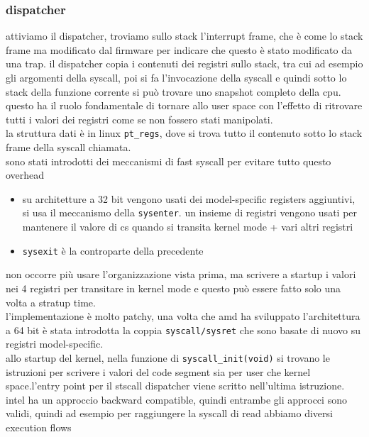 \documentclass[12pt, oneside]{extbook} %
\begin{document}
\subsubsection{dispatcher}
attiviamo il dispatcher, troviamo sullo stack l'interrupt frame, che è come lo stack frame ma modificato dal firmware per indicare che questo è stato modificato da una trap. il dispatcher copia i contenuti dei registri sullo stack, tra cui ad esempio gli argomenti della syscall, poi si fa l'invocazione della syscall e quindi sotto lo stack della funzione corrente si può trovare uno snapshot completo della cpu. questo ha il ruolo fondamentale di tornare allo user space con l'effetto di ritrovare tutti i valori dei registri come se non fossero stati manipolati.\\la struttura dati è in linux \texttt{pt\_regs}, dove si trova tutto il contenuto sotto lo stack frame della syscall chiamata.\\sono stati introdotti dei meccanismi di fast syscall per evitare tutto questo overhead
\begin{itemize}
\item su architetture a 32 bit vengono usati dei model-specific registers aggiuntivi, si usa il meccanismo della \texttt{sysenter}. un insieme di 
registri vengono usati per mantenere il valore di cs quando si transita kernel mode + vari altri registri
\item \texttt{sysexit} è la controparte della precedente
\end{itemize}
non occorre più usare l'organizzazione vista prima, ma scrivere a startup i valori nei 4 registri per transitare in kernel mode e questo può essere fatto solo una volta a stratup time.\\l'implementazione è molto patchy, una volta che amd ha sviluppato l'architettura a 64 bit è stata introdotta la coppia \texttt{syscall/sysret} che sono basate di nuovo su registri model-specific.\\allo startup del kernel, nella funzione di \texttt{syscall\_init(void)} si trovano le istruzioni per scrivere i valori del code segment sia per user che kernel space.l'entry point per il stscall dispatcher viene scritto nell'ultima istruzione.\\intel ha un approccio backward compatible, quindi entrambe gli approcci sono validi, quindi ad esempio per raggiungere la syscall di read abbiamo diversi execution flows\\
\end{document}
